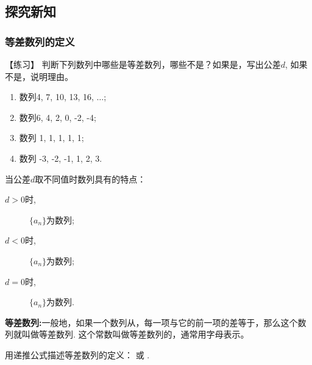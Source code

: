\documentclass[10pt,a4paper]{article}
\begin{document}
		\subsection{探究新知} %
		\label{sub:探究新知}
		
			\subsubsection{等差数列的定义}

			【练习】 判断下列数列中哪些是等差数列，哪些不是？如果是，写出公差$d$, 如果不是，说明理由。 

					\begin{enumerate}
						\item 数列4, 7, 10, 13, 16, $\ldots$; 
						\item 数列6, 4, 2, 0, -2, -4; 
						\item 数列 1, 1, 1, 1, 1; 
						\item 数列 -3, -2, -1, 1, 2, 3. 
					\end{enumerate}
				\vspace{10pt}

					当公差$d$取不同值时数列具有的特点： 
						\begin{description}
							\item[$d>0$时,] $\{a_n\}$为\underline{\hspace{30pt}}数列; 
							\item[$d<0$时,] $\{a_n\}$为\underline{\hspace{30pt}}数列; 
							\item[$d=0$时,] $\{a_n\}$为\underline{\hspace{30pt}}数列. 
						\end{description}


			\textbf{等差数列:}一般地，如果一个数列从\underline{\hspace{40pt}}，每一项与它的前一项的差等于\underline{\hspace{40pt}}，那么这个数列就叫做等差数列. 这个常数叫做等差数列的\underline{\hspace{30pt}}，通常用字母\underline{\hspace{15pt}}表示。
			\vspace{20pt}

			用递推公式描述等差数列的定义：
			\underline{\hspace{60pt}} 或 \underline{\hspace{60pt}}. 
\end{document}

